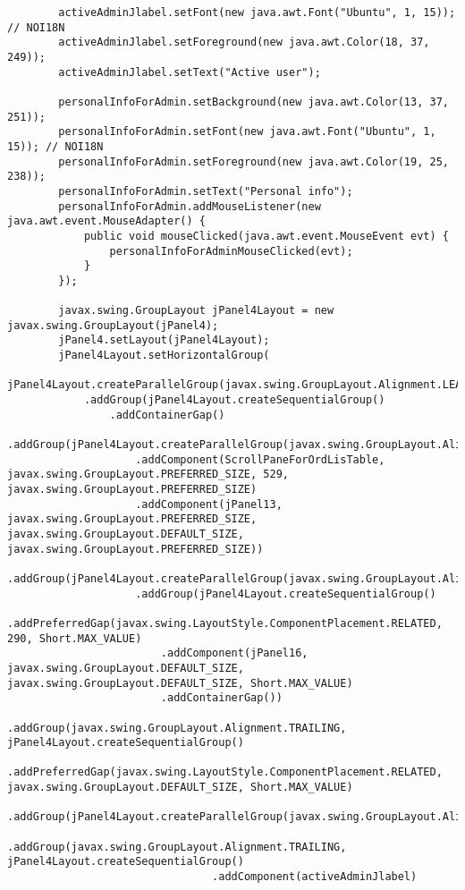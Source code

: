 \documentclass[12pt,a4paper]{article}
\begin{document}
\begin{lstlisting}
        activeAdminJlabel.setFont(new java.awt.Font("Ubuntu", 1, 15)); // NOI18N
        activeAdminJlabel.setForeground(new java.awt.Color(18, 37, 249));
        activeAdminJlabel.setText("Active user");

        personalInfoForAdmin.setBackground(new java.awt.Color(13, 37, 251));
        personalInfoForAdmin.setFont(new java.awt.Font("Ubuntu", 1, 15)); // NOI18N
        personalInfoForAdmin.setForeground(new java.awt.Color(19, 25, 238));
        personalInfoForAdmin.setText("Personal info");
        personalInfoForAdmin.addMouseListener(new java.awt.event.MouseAdapter() {
            public void mouseClicked(java.awt.event.MouseEvent evt) {
                personalInfoForAdminMouseClicked(evt);
            }
        });

        javax.swing.GroupLayout jPanel4Layout = new javax.swing.GroupLayout(jPanel4);
        jPanel4.setLayout(jPanel4Layout);
        jPanel4Layout.setHorizontalGroup(
            jPanel4Layout.createParallelGroup(javax.swing.GroupLayout.Alignment.LEADING)
            .addGroup(jPanel4Layout.createSequentialGroup()
                .addContainerGap()
                .addGroup(jPanel4Layout.createParallelGroup(javax.swing.GroupLayout.Alignment.LEADING)
                    .addComponent(ScrollPaneForOrdLisTable, javax.swing.GroupLayout.PREFERRED_SIZE, 529, javax.swing.GroupLayout.PREFERRED_SIZE)
                    .addComponent(jPanel13, javax.swing.GroupLayout.PREFERRED_SIZE, javax.swing.GroupLayout.DEFAULT_SIZE, javax.swing.GroupLayout.PREFERRED_SIZE))
                .addGroup(jPanel4Layout.createParallelGroup(javax.swing.GroupLayout.Alignment.LEADING)
                    .addGroup(jPanel4Layout.createSequentialGroup()
                        .addPreferredGap(javax.swing.LayoutStyle.ComponentPlacement.RELATED, 290, Short.MAX_VALUE)
                        .addComponent(jPanel16, javax.swing.GroupLayout.DEFAULT_SIZE, javax.swing.GroupLayout.DEFAULT_SIZE, Short.MAX_VALUE)
                        .addContainerGap())
                    .addGroup(javax.swing.GroupLayout.Alignment.TRAILING, jPanel4Layout.createSequentialGroup()
                        .addPreferredGap(javax.swing.LayoutStyle.ComponentPlacement.RELATED, javax.swing.GroupLayout.DEFAULT_SIZE, Short.MAX_VALUE)
                        .addGroup(jPanel4Layout.createParallelGroup(javax.swing.GroupLayout.Alignment.LEADING)
                            .addGroup(javax.swing.GroupLayout.Alignment.TRAILING, jPanel4Layout.createSequentialGroup()
                                .addComponent(activeAdminJlabel)

\end{lstlisting}
\end{document}

